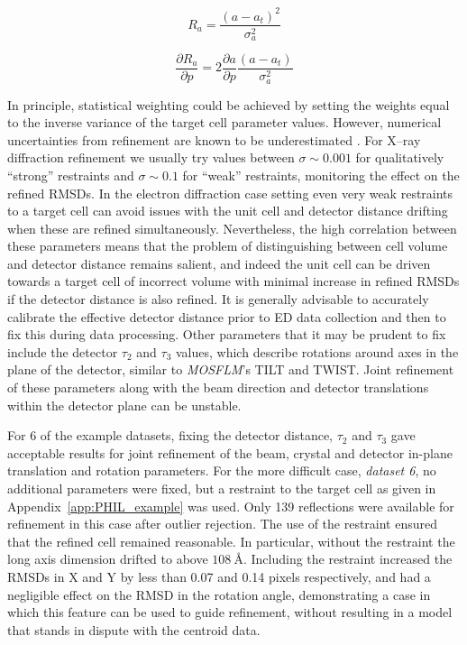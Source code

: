 \documentclass[preprint]{iucr}
\newcommand{\mosflm}{\emph{MOSFLM}\xspace}
\newcommand{\pder}[2][]{\frac{\partial#1}{\partial#2}}
\begin{document}
\begin{equation}
\label{eq:restraint_to_target}
R_a = \frac{\left( a - a_t \right)^2}{\sigma_a^2}
\end{equation}

\begin{equation}
\pder[R_a]{p} = 2 \pder[a]{p} \frac{\left( a - a_t \right)}{\sigma_a^2}
\end{equation}

In principle, statistical weighting could be achieved by setting the weights
equal to the inverse variance of the target cell parameter values. However,
numerical uncertainties from refinement are
known to be underestimated \cite{Dauter2015}. For X--ray diffraction refinement
we usually try values between $\sigma \sim 0.001$ for qualitatively ``strong''
restraints and $\sigma \sim 0.1$ for ``weak'' restraints, monitoring the effect
on the refined RMSDs. In the electron diffraction case setting even very weak
restraints to a target cell can avoid issues with the unit cell and detector
distance drifting when these are refined simultaneously. Nevertheless, the high
correlation between these parameters means that the problem of distinguishing
between cell volume and detector distance remains salient, and indeed the unit
cell can be driven towards a target cell of incorrect volume with minimal
increase in refined RMSDs if the detector distance is also refined. It is
generally advisable to accurately calibrate the effective detector distance
prior to ED data collection and then to fix this during data processing. Other
parameters that it may be prudent to fix include the detector $\tau_2$ and
$\tau_3$ values, which describe rotations around axes in the plane of the
detector, similar to \mosflm's TILT and TWIST. Joint refinement of these
parameters along with the beam direction and detector translations
within the detector plane can be unstable.

For 6 of the example datasets, fixing the detector distance, $\tau_2$ and $\tau_3$
gave acceptable results for joint refinement of the beam, crystal and detector
in-plane translation and rotation parameters. For the more difficult case,
\emph{dataset 6}, no additional parameters were fixed, but a restraint to
the target cell as given in Appendix~\ref{app:PHIL_example} was used. Only 139
reflections were available for refinement in this case after outlier rejection.
The use of the restraint ensured that the refined cell remained reasonable. In
particular, without the restraint the long axis dimension drifted to above
$\SI{108}{\angstrom}$. Including the restraint increased the RMSDs in X and Y
by less than 0.07 and 0.14 pixels respectively, and had a negligible effect on
the RMSD in the rotation angle, demonstrating a case in which this feature can
be used to guide refinement, without resulting in a model that stands in dispute
with the centroid data.
\end{document}
